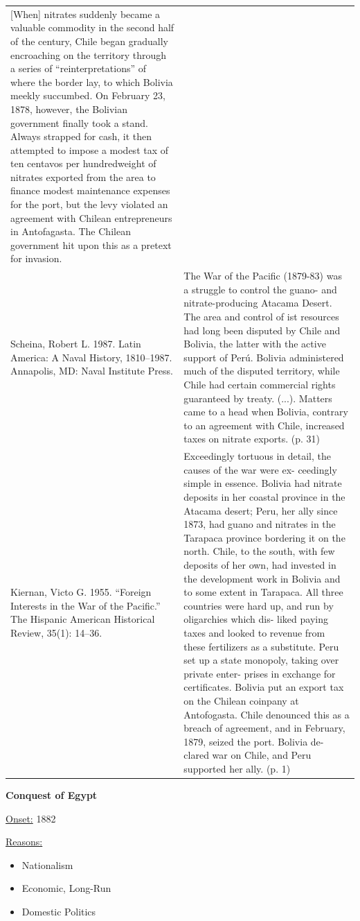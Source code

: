 {\begin{longtable}{p{}p{}}
[When] nitrates suddenly became a valuable commodity in the second half of the century, Chile began gradually encroaching on the territory through a series of “reinterpretations” of where the border lay, to which Bolivia meekly succumbed. On February 23, 1878, however, the Bolivian government finally took a stand. Always strapped for cash, it then attempted to impose a modest tax of ten centavos per hundredweight of nitrates exported from the area to finance modest maintenance expenses for the port, but the levy violated an agreement with Chilean entrepreneurs in Antofagasta. The Chilean government hit upon this as a pretext for invasion.
\\
Scheina, Robert L. 1987. Latin America: A Naval History, 1810–1987. Annapolis, MD: Naval Institute Press. & The War of the Pacific (1879-83) was a struggle to control the guano- and nitrate-producing Atacama Desert. The area and control of ist resources had long been disputed by Chile and Bolivia, the latter with the active support of Perú. Bolivia administered much of the disputed territory, while Chile had certain commercial rights guaranteed by treaty. (...). Matters came to a head when Bolivia, contrary to an agreement with Chile, increased taxes on nitrate exports. (p. 31)
\\
Kiernan, Victo G. 1955. “Foreign Interests in the War of the Pacific.” The Hispanic American Historical Review, 35(1): 14–36. & Exceedingly tortuous in detail, the causes of the war were ex- ceedingly simple in essence. Bolivia had nitrate deposits in her coastal province in the Atacama desert; Peru, her ally since 1873, had guano and nitrates in the Tarapaca province bordering it on the north. Chile, to the south, with few deposits of her own, had invested in the development work in Bolivia and to some extent in Tarapaca. All three countries were hard up, and run by oligarchies which dis- liked paying taxes and looked to revenue from these fertilizers as a substitute. Peru set up a state monopoly, taking over private enter- prises in exchange for certificates. Bolivia put an export tax on the Chilean coinpany at Antofogasta. Chile denounced this as a breach of agreement, and in February, 1879, seized the port. Bolivia de- clared war on Chile, and Peru supported her ally. (p. 1)
\\
\end{longtable}}
\clearpage
         \textbf{Conquest of Egypt} 

          \underline{Onset:} 1882         

\underline{Reasons:}
\begin{itemize}
\item Nationalism
\item Economic, Long-Run
\item Domestic Politics
\end{itemize}

